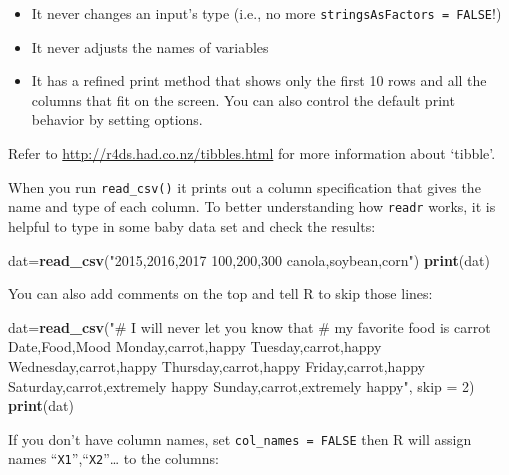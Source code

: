 \documentclass[12pt,]{krantz}
\makeatletter
\newenvironment{Shaded}{\begin{snugshade}}{\end{snugshade}}
\newcommand{\KeywordTok}[1]{\textcolor[rgb]{0.27,0.27,0.27}{\textbf{#1}}}
\newcommand{\DataTypeTok}[1]{\textcolor[rgb]{0.27,0.27,0.27}{#1}}
\newcommand{\DecValTok}[1]{\textcolor[rgb]{0.06,0.06,0.06}{#1}}
\newcommand{\StringTok}[1]{\textcolor[rgb]{0.5,0.5,0.5}{#1}}
\newcommand{\NormalTok}[1]{#1}
\providecommand{\tightlist}{%
  \setlength{\itemsep}{0pt}\setlength{\parskip}{0pt}}
\newenvironment{kframe}{%
\medskip{}
\setlength{\fboxsep}{.8em}
 \def\at@end@of@kframe{}%
 \ifinner\ifhmode%
  \def\at@end@of@kframe{\end{minipage}}%
  \begin{minipage}{\columnwidth}%
 \fi\fi%
 \def\FrameCommand##1{\hskip\@totalleftmargin \hskip-\fboxsep
 \colorbox{shadecolor}{##1}\hskip-\fboxsep
     \hskip-\linewidth \hskip-\@totalleftmargin \hskip\columnwidth}%
 \MakeFramed {\advance\hsize-\width
   \@totalleftmargin\z@ \linewidth\hsize
   \@setminipage}}%
 {\par\unskip\endMakeFramed%
 \at@end@of@kframe}
\renewenvironment{Shaded}{\begin{kframe}}{\end{kframe}}
\theoremstyle{definition}
\theoremstyle{definition}
\theoremstyle{definition}
\theoremstyle{remark}
\makeatother
\begin{document}
\begin{itemize}
\tightlist
\item
  It never changes an input's type (i.e., no more
  \texttt{stringsAsFactors\ =\ FALSE}!)
\item
  It never adjusts the names of variables
\item
  It has a refined print method that shows only the first 10 rows and
  all the columns that fit on the screen. You can also control the
  default print behavior by setting options.
\end{itemize}

Refer to \url{http://r4ds.had.co.nz/tibbles.html} for more information
about `tibble'.

When you run \texttt{read\_csv()} it prints out a column specification
that gives the name and type of each column. To better understanding how
\texttt{readr} works, it is helpful to type in some baby data set and
check the results:

\begin{Shaded}
\begin{Highlighting}[]
\NormalTok{dat=}\KeywordTok{read_csv}\NormalTok{(}\StringTok{"2015,2016,2017}
\StringTok{100,200,300}
\StringTok{canola,soybean,corn"}\NormalTok{)}
\KeywordTok{print}\NormalTok{(dat)}
\end{Highlighting}
\end{Shaded}

You can also add comments on the top and tell R to skip those lines:

\begin{Shaded}
\begin{Highlighting}[]
\NormalTok{dat=}\KeywordTok{read_csv}\NormalTok{(}\StringTok{"# I will never let you know that}
\StringTok{          # my favorite food is carrot}
\StringTok{          Date,Food,Mood}
\StringTok{          Monday,carrot,happy}
\StringTok{          Tuesday,carrot,happy}
\StringTok{          Wednesday,carrot,happy}
\StringTok{          Thursday,carrot,happy}
\StringTok{          Friday,carrot,happy}
\StringTok{          Saturday,carrot,extremely happy}
\StringTok{          Sunday,carrot,extremely happy"}\NormalTok{, }\DataTypeTok{skip =} \DecValTok{2}\NormalTok{)}
\KeywordTok{print}\NormalTok{(dat)}
\end{Highlighting}
\end{Shaded}

If you don't have column names, set \texttt{col\_names\ =\ FALSE} then R
will assign names ``\texttt{X1}'',``\texttt{X2}''\ldots{} to the
columns:
\end{document}
